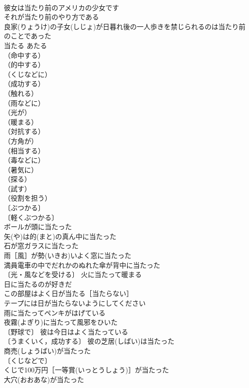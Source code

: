 \documentclass[8pt]{extreport}
\begin{document}
\begin{CJK}{UTF8}{min}
\\	彼女は当たり前のアメリカの少女です 
\\	それが当たり前のやり方である 
\\	良家(りょうけ)の子女(しじょ)が日暮れ後の一人歩きを禁じられるのは当たり前のことであった 
\\	当たる	あたる 
\\	（命中する）
\\	（的中する）
\\	（くじなどに）
\\	（成功する）
\\	（触れる）
\\	（雨などに）
\\	（光が）
\\	（暖まる）
\\	（対抗する）
\\	（方角が）
\\	（相当する）
\\	（毒などに）
\\	（暑気に）
\\	（探る）
\\	（試す）
\\	（役割を担う）
\\	〔ぶつかる〕
\\	〔軽くぶつかる〕
\\	ボールが頭に当たった 
\\	矢(や)は的(まと)の真ん中に当たった 
\\	石が窓ガラスに当たった 
\\	雨［風］が勢(いきお)いよく窓に当たった 
\\	満員電車の中でだれかのぬれた傘が背中に当たった 
\\	〔光・風などを受ける〕 火に当たって暖まる 
\\	日に当たるのが好きだ 
\\	この部屋はよく日が当たる［当たらない］ 
\\	テープには日が当たらないようにしてください 
\\	雨に当たってペンキがはげている 
\\	夜霧(よぎり)に当たって風邪をひいた 
\\	〔野球で〕 彼は今日はよく当たっている 
\\	〔うまくいく，成功する〕 彼の芝居(しばい)は当たった 
\\	商売(しょうばい)が当たった 
\\	〔くじなどで〕
\\	くじで100万円［一等賞(いっとうしょう)］が当たった 
\\	大穴(おおあな)が当たった 

\end{CJK}
\end{document}
